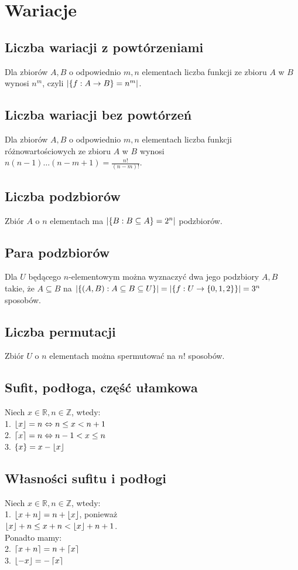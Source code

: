\section{Wariacje}
\subsection*{Liczba wariacji z powtórzeniami}
Dla zbiorów $A, B$ o odpowiednio $m, n$ elementach liczba funkcji ze zbioru $A$ w $B$
wynosi $n^m$, czyli $\left| \{ f: A \to B \} = n^m \right|$.

\subsection*{Liczba wariacji bez powtórzeń}
Dla zbiorów $A, B$ o odpowiednio $m, n$ elementach liczba funkcji różnowartościowych
ze zbioru $A$ w $B$ wynosi $n (n - 1) \ldots (n - m + 1) = \frac{n!}{(n - m)!}$.

\subsection*{Liczba podzbiorów}
Zbiór $A$ o $n$ elementach ma $\left| \{ B : B \subseteq A \} = 2^n \right|$ podzbiorów.

\subsection*{Para podzbiorów}
Dla $U$ będącego $n$-elementowym można wyznaczyć dwa jego podzbiory $A, B$ takie,
że $A \subseteq B$ na $\left| \{ (A,B) : A \subseteq B \subseteq U \} \right| = 
\left| \{ f: U \to \{ 0, 1, 2 \} \} \right| = 3^n$ sposobów.

\subsection*{Liczba permutacji}
Zbiór $U$ o $n$ elementach można spermutować na $n!$ sposobów.

\subsection*{Sufit, podłoga, część ułamkowa}
Niech $x \in \mathbb{R}, n \in \mathbb{Z}$, wtedy: \\
1. $ \left\lfloor x \right\rfloor = n \Leftrightarrow n \leq x < n + 1 $ \\
2. $ \left\lceil x \right\rceil  = n \Leftrightarrow n - 1 < x \leq n $ \\
3. $ \left\{ x \right\} = x - \left\lfloor x \right\rfloor $

\subsection*{Własności sufitu i podłogi}
Niech $x \in \mathbb{R}, n \in \mathbb{Z}$, wtedy: \\
1. $ \left\lfloor x + n \right\rfloor = n + \left\lfloor x \right\rfloor $, ponieważ \\
$ \left\lfloor x \right\rfloor + n \leq x + n < \left\lfloor x \right\rfloor + n + 1 $. \\
Ponadto mamy: \\
2. $ \left\lceil x + n \right\rceil = n + \left\lceil x \right\rceil $ \\
3. $ \left\lfloor -x \right\rfloor = -\left\lceil x \right\rceil $


